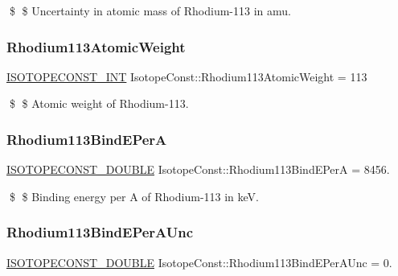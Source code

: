 \$ \$ Uncertainty in atomic mass of Rhodium-\/113 in amu. \mbox{\label{group___isotope_const-_rhodium-_rh113_ga11f8712825e40ed286ef8079dd0b409a}} 
\subsubsection{\texorpdfstring{Rhodium113\+Atomic\+Weight}{Rhodium113AtomicWeight}}
{\footnotesize\ttfamily \mbox{\hyperlink{group___isotope_const-_macros_ga5f18360b3e99483a35c32d789e62621c}{I\+S\+O\+T\+O\+P\+E\+C\+O\+N\+S\+T\+\_\+\+I\+NT}} Isotope\+Const\+::\+Rhodium113\+Atomic\+Weight = 113}

\$ \$ Atomic weight of Rhodium-\/113. \mbox{\label{group___isotope_const-_rhodium-_rh113_ga547ee90ce572072a2baa2307b43c9465}} 
\subsubsection{\texorpdfstring{Rhodium113\+Bind\+E\+PerA}{Rhodium113BindEPerA}}
{\footnotesize\ttfamily \mbox{\hyperlink{group___isotope_const-_macros_ga8f45a7272ce02c0b4c65c44636ed719a}{I\+S\+O\+T\+O\+P\+E\+C\+O\+N\+S\+T\+\_\+\+D\+O\+U\+B\+LE}} Isotope\+Const\+::\+Rhodium113\+Bind\+E\+PerA = 8456.}

\$ \$ Binding energy per A of Rhodium-\/113 in keV. \mbox{\label{group___isotope_const-_rhodium-_rh113_ga19a0910145a1312a9b6537f99f2ec3d9}} 
\subsubsection{\texorpdfstring{Rhodium113\+Bind\+E\+Per\+A\+Unc}{Rhodium113BindEPerAUnc}}
{\footnotesize\ttfamily \mbox{\hyperlink{group___isotope_const-_macros_ga8f45a7272ce02c0b4c65c44636ed719a}{I\+S\+O\+T\+O\+P\+E\+C\+O\+N\+S\+T\+\_\+\+D\+O\+U\+B\+LE}} Isotope\+Const\+::\+Rhodium113\+Bind\+E\+Per\+A\+Unc = 0.}

